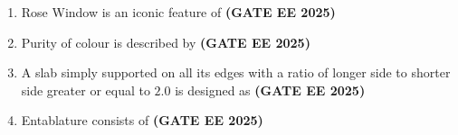 \documentclass[journal,12pt,onecolumn]{IEEEtran}
\theoremstyle{remark}
\begin{document}
{\begin{enumerate}
\begin{enumerate}
    \end{enumerate}
\item Rose Window is an iconic feature of \hfill \textbf{(GATE EE 2025)}
\begin{enumerate}
\end{enumerate}
\item Purity of colour is described by \hfill \textbf{(GATE EE 2025)}
\begin{enumerate}
\end{enumerate}
\item A slab simply supported on all its edges with a ratio of longer side to shorter side greater or equal to $2.0$ is designed as \hfill \textbf{(GATE EE 2025)}
\begin{enumerate}
\end{enumerate}
\item Entablature consists of \hfill \textbf{(GATE EE 2025)}
\begin{enumerate}

\end{enumerate}
\end{enumerate}}
\end{document}
